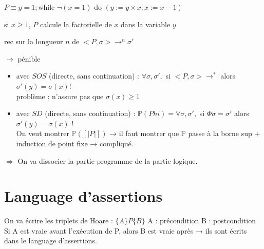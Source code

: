 \documentclass[10pt,a4paper]{article}
\newcommand{\semm}[1]{\left[| #1 | \right]}
\newcommand{\Ps}{\mathbb{P}}
\begin{document}
\begin{ex}
 $P \equiv y=1;$while $\lnot (x=1)$ do $(y:=y \times x; x := x-1)$\\
\begin{minipage}[c]{150pt}
 \begin{propriete}\og si $x \geq 1$, $P$ calcule la factorielle de $x$ dans la variable $y$ \fg\end{propriete}
\end{minipage}\begin{minipage}[c]{150pt}
\begin{dem}
 rec sur la longueur $n$ de $<P, \sigma> →^n \sigma'$
\end{dem}\end{minipage}\hspace{1cm}\begin{minipage}[b]{100pt}
                        $\longrightarrow$ pénible
                       \end{minipage}


\begin{itemize}
 \item avec $SOS$ (directe, sans continuation) : $\forall \sigma, \sigma',$ si $<P, \sigma> →^*$ alors $\sigma'(y) = \sigma(x)$!\\
problème : n'assure pas que $\sigma(x) \geq 1$
\item avec $SD$ (directe, sans continuation) : $\Ps(Phi) = \forall \sigma, \sigma',$ si $\Phi \sigma = \sigma'$ alors $\sigma'(y) = \sigma(x)$ !\\
On veut montrer $\Ps(\semm{P})$ → il faut montrer que $\Ps$ passe à la borne sup + induction de point fixe → compliqué.
\end{itemize}
\end{ex}


$\Rightarrow$ On va dissocier la partie programme de la partie logique.

\section{Language d'assertions}
On va écrire les triplets de Hoare : $\{A\}P\{B\}$
A : précondition
B : postcondition
\og Si A est vraie avant l'exécution de P, alors B est vraie après \fg → ils sont écrits dans le language d'assertions.
\end{document}
